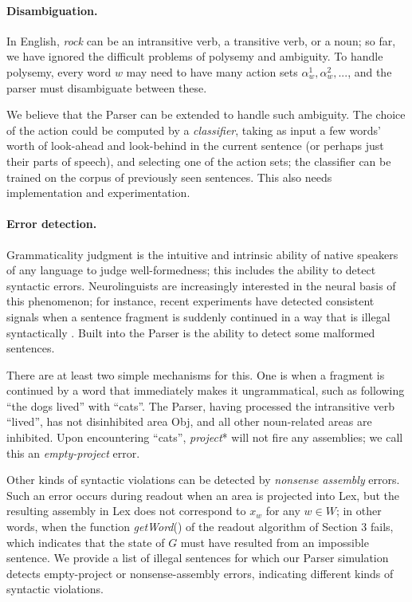 \documentclass[11pt,a4paper]{article}
\begin{document}
\paragraph{Disambiguation.}
In English, {\em rock} can be an intransitive verb, a transitive verb, or a noun; so far, we have ignored the difficult problems of polysemy and ambiguity. To handle polysemy, every word $w$ may need to have many action sets $\alpha_w^1, \alpha_w^2,...$, and the parser must disambiguate between these.

We believe that the Parser can be extended to handle such ambiguity. The choice of the action could be computed by a {\em classifier}, taking as input a few words' worth of look-ahead and look-behind in the current sentence (or perhaps just their parts of speech), and selecting one of the action sets; the classifier can be trained on the corpus of previously seen sentences.  This also needs implementation and experimentation.

\paragraph{Error detection.} \label{error-detection}
Grammaticality judgment is the intuitive and intrinsic ability of native speakers of any language to judge well-formedness; this includes the ability to detect syntactic errors. Neurolinguists are increasingly interested in the neural basis of this phenomenon; for instance, recent experiments have detected consistent signals when a sentence fragment is suddenly continued in a way that is illegal syntactically \cite{chomsky-illusion}. Built into the Parser is the ability to detect some malformed sentences. 

There are at least two simple mechanisms for this. One is when a fragment is continued by a word that immediately makes it ungrammatical, such as following “the dogs lived” with “cats”. The Parser, having processed the intransitive verb “lived”, has not disinhibited area {\sc Obj}, and all other noun-related areas are inhibited. Upon encountering “cats”, {\em project}* will not fire any assemblies; we call this an  {\em empty-project} error. 

Other kinds of syntactic violations can be detected by {\em nonsense assembly} errors. Such an error occurs during readout when an area is projected into {\sc Lex}, but the resulting assembly in {\sc Lex} does not correspond to $x_w$ for any $w \in W$; in other words, when the function {\em getWord}() of the readout algorithm of Section 3 fails, which indicates that the state of $G$ must have resulted from an impossible sentence. We provide a list of illegal sentences for which our Parser simulation detects empty-project or nonsense-assembly errors, indicating different kinds of syntactic violations.
\end{document}
